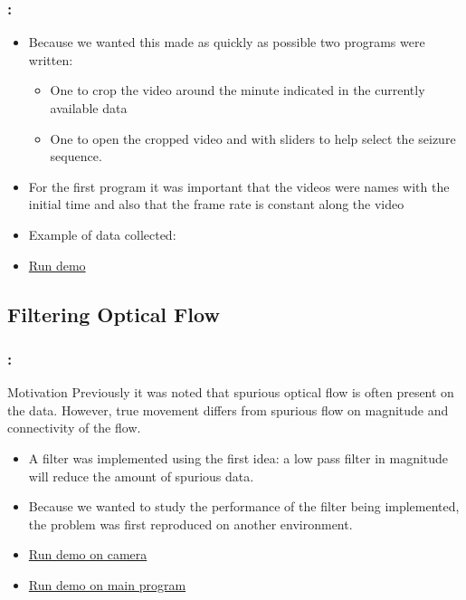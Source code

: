 \documentclass{beamer}
\begin{document}
\begin{frame}[fragile]
  \frametitle{\secname : \subsecname}

  \begin{itemize}
     \item Because we wanted this made as quickly as possible two programs were written:
       \begin{itemize}
           \item One to crop the video around the minute indicated in the currently available data
           \item One to open the cropped video and with sliders to help select the seizure sequence.
      \end{itemize}
      \item For the first program it was important that the videos were names with the initial time and also that the
        frame rate is constant along the video
      \item Example of data collected:
        \begin{itemize}
        \end{itemize}
      \item  \href{run:runCollect.sh}{Run demo}
  \end{itemize}
\end{frame}


\subsection{Filtering Optical Flow}
\begin{frame}[fragile]
  \frametitle{\secname : \subsecname}
  \begin{alertblock}{Motivation}
    Previously it was noted that spurious optical flow is often present on the data. However, true movement differs from
    spurious flow on magnitude and connectivity of the flow.
  \end{alertblock}

  \begin{itemize}
     \item A filter was implemented using the first idea: a low pass filter in magnitude will reduce the amount of
       spurious data.
     \item Because we wanted to study the performance of the filter being implemented, the problem was first reproduced
       on another environment.
     \item  \href{run:runFlowFilter.sh}{Run demo on camera}
     \item  \href{run:runFlow.sh}{Run demo on main program}
  \end{itemize}
\end{frame}
\end{document}
